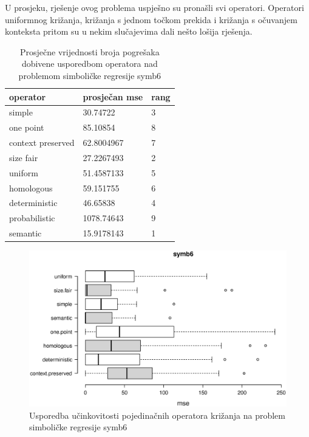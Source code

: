 U prosjeku, rješenje ovog problema uspješno su pronašli svi operatori. Operatori uniformnog križanja, križanja s jednom točkom prekida i križanja s očuvanjem konteksta pritom su u nekim slučajevima dali nešto lošija rješenja.

\begin{table}[H]
 	\centering
    \caption{Prosječne vrijednosti broja pogrešaka dobivene usporedbom operatora nad problemom simboličke regresije symb6}
    
    \begin{tabular}{| l | l | l |}
    \hline
    \textbf{operator} & \textbf{prosječan mse} & \textbf{rang}\\ \hline
    simple & 30.74722 & 3\\ \hline
    one point & 85.10854 & 8\\ \hline
    context preserved & 62.8004967 & 7\\ \hline
    size fair & 27.2267493 & 2\\ \hline
    uniform & 51.4587133 & 5\\ \hline
    homologous & 59.151755 & 6\\ \hline
    deterministic & 46.65838 & 4\\ \hline
    probabilistic & 1078.74643 & 9\\ \hline
    semantic & 15.9178143 & 1\\ \hline
    \end{tabular}
    

    \label{symb6table}
\end{table}

\begin{figure}[H]
	\centering
	\includegraphics[trim=0cm 4cm 0cm 0cm, scale=0.5]{./slike/boxPlots/symb6.eps}
	\caption{Usporedba učinkovitosti pojedinačnih operatora križanja na problem simboličke regresije symb6}
	\label{symb6box}
\end{figure}


